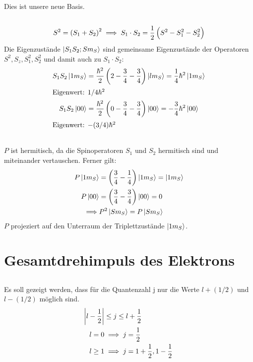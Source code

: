 Dies ist unsere neue Basis.

\subsection{}
\begin{align*}
 S^2 = \del{S_1 + S_2}^2 \implies S_1\cdot S_2 = \frac12\del{S^2 - S_1^2 - S_2^2}
\end{align*}
Die Eigenzustände $\left|S_1 S_2; S m_S\right\rangle$ sind gemeinsame Eigenzustände der Operatoren $S^2, S_z, S_1^2, S_2^2$ und damit auch zu $S_1\cdot S_2$:
\begin{align*}
 S_1S_2\ket{1m_S} &= \frac{\hbar^2}2 \del{2 - \frac34 - \frac34}\ket{lm_S} = \frac14\hbar^2\ket{1m_S}\\
 \intertext{%
  Eigenwert: $1/4 \hbar^2$}
 S_1S_2\ket{00} &= \frac{\hbar^2}2 \del{0 - \frac34 - \frac34}\ket{00} = -\frac34\hbar^2\ket{00}\\
 \intertext{%
  Eigenwert: $-(3/4)\hbar^2$}
\end{align*}

\subsection{}
$P$ ist hermitisch, da die Spinoperatoren $S_1$ und $S_2$ hermitisch sind und miteinander vertauschen. Ferner gilt:
\begin{align*}
 P\ket{1m_S} &= \del{\frac34 - \frac14} \ket{1m_S} = \ket{1m_S}\\
 P\ket{00} &= \del{\frac34 - \frac34}\ket{00} = 0\\
 \implies &P^2\ket{Sm_S} = P\ket{Sm_S}
\end{align*}
$P$ projeziert auf den Unterraum der Triplettzustände $\left|1m_S\right\rangle$.

\section{Gesamtdrehimpuls des Elektrons}

\subsection{}
Es soll gezeigt werden, dass für die Quantenzahl j nur die Werte $l + (1/2)$ und
$l - (1/2)$ möglich sind.
\begin{align*}
 \abs{l-\frac12} &\leq j \leq l + \frac12\\
 l = 0 &\implies j = \frac12\\
 l \geq 1 &\implies j = 1 + \frac12, 1 -\frac12
\end{align*}

